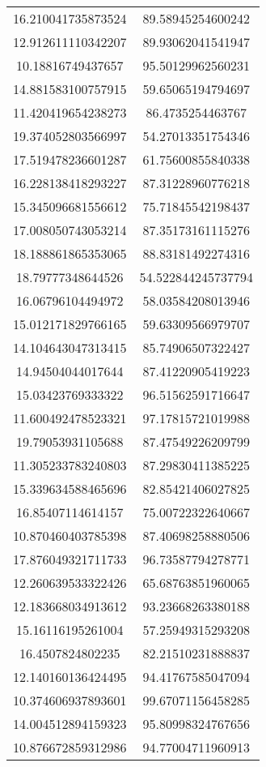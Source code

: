 \begin{table}
\begin{tabular}{cc}
16.210041735873524 & 89.58945254600242 \\
12.912611110342207 & 89.93062041541947 \\
10.18816749437657 & 95.50129962560231 \\
14.881583100757915 & 59.65065194794697 \\
11.420419654238273 & 86.4735254463767 \\
19.374052803566997 & 54.27013351754346 \\
17.519478236601287 & 61.75600855840338 \\
16.228138418293227 & 87.31228960776218 \\
15.345096681556612 & 75.71845542198437 \\
17.008050743053214 & 87.35173161115276 \\
18.188861865353065 & 88.83181492274316 \\
18.79777348644526 & 54.522844245737794 \\
16.06796104494972 & 58.03584208013946 \\
15.012171829766165 & 59.63309566979707 \\
14.104643047313415 & 85.74906507322427 \\
14.94504044017644 & 87.41220905419223 \\
15.03423769333322 & 96.51562591716647 \\
11.600492478523321 & 97.17815721019988 \\
19.79053931105688 & 87.47549226209799 \\
11.305233783240803 & 87.29830411385225 \\
15.339634588465696 & 82.85421406027825 \\
16.85407114614157 & 75.00722322640667 \\
10.870460403785398 & 87.40698258880506 \\
17.876049321711733 & 96.73587794278771 \\
12.260639533322426 & 65.68763851960065 \\
12.183668034913612 & 93.23668263380188 \\
15.16116195261004 & 57.25949315293208 \\
16.4507824802235 & 82.21510231888837 \\
12.140160136424495 & 94.41767585047094 \\
10.374606937893601 & 99.67071156458285 \\
14.004512894159323 & 95.80998324767656 \\
10.876672859312986 & 94.77004711960913 \\

\end{tabular}
\end{table}
